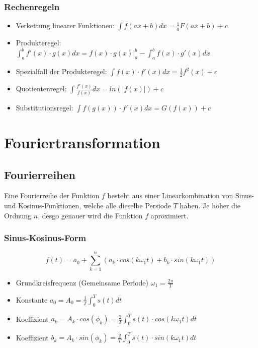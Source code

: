 \subsubsection{Rechenregeln}
\begin{itemize}
  \item Verkettung linearer Funktionen: $\int f(ax+b)dx = \frac{1}{a}F(ax+b) + c$
  \item Produkteregel: $\int_a^b f'(x) \cdot g(x) dx =
    f(x) \cdot g(x)|^b_a - \int_a^b f(x) \cdot g'(x) dx$
  \item Spezialfall der Produkteregel: $\int f(x) \cdot f'(x) dx = \frac{1}{2}f^2(x) + c$
  \item Quotientenregel: $\int \frac{f'(x)}{f(x)}dx = ln(|f(x)|) + c$
  \item Substitutionsregel: $ \int f(g(x)) \cdot f'(x) dx = G(f(x)) + c$
\end{itemize}


\section{Fouriertransformation}
\subsection{Fourierreihen}
Eine Fourierreihe der Funktion $f$ besteht aus einer Linearkombination
von Sinus- und Kosinus-Funktionen, welche alle dieselbe Persiode $T$
haben. Je höher die Ordnung $n$, desgo genauer wird die Funktion $f$ aproximiert.

\subsubsection{Sinus-Kosinus-Form}
\[
  f(t) = a_0 + \sum_{k=1}^{n}
  (a_k \cdot cos(k \omega_1 t) + b_k \cdot sin(k \omega_1 t))
\]
\begin{itemize}
  \item Grundkreisfrequenz (Gemeinsame Periode) $\omega_1 = \frac{2\pi}{T}$
  \item Konstante $a_0 = A_0 = \frac{1}{T}\int_0^T s(t) dt$
  \item Koeffizient $a_k = A_k \cdot cos(\phi_k) =
    \frac{2}{T} \int_0^T s(t) \cdot cos(k \omega_1 t) dt$
  \item Koeffizient $b_k = A_k \cdot sin(\phi_k) =
    \frac{2}{T} \int_0^T s(t) \cdot sin(k \omega_1 t) dt$
\end{itemize}


